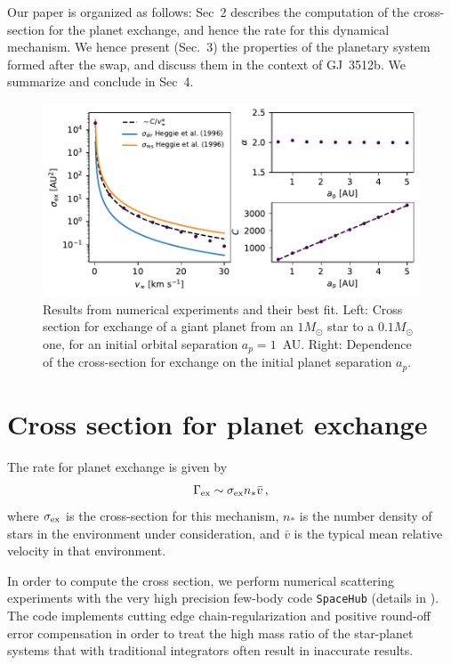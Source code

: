 \documentclass[twocolumn]{aastex62}
\begin{document}
Our paper is organized as follows: Sec~2 describes the computation of the cross-section for the planet exchange, 
and hence the rate for this dynamical mechanism. We hence present (Sec.~3) the 
properties of the planetary system formed after the swap, and discuss them in the context of GJ~3512b. We summarize and conclude in Sec~4.

\begin{figure}
 \includegraphics[width=1\columnwidth]{letter-fitting}
  \caption{Results from numerical experiments and their best fit. Left: Cross section for exchange of a giant planet from an $1M_\odot$ star to a $0.1M_\odot$ one, for an initial orbital separation $a_p=1$~AU.  Right: Dependence of the cross-section for exchange on the initial planet separation $a_p$. } 
 \label{fig:fitting}
\end{figure}

\section{Cross section for planet exchange}

The rate for planet exchange is given by
\begin{equation}
\Gamma_{\rm ex} \sim \sigma_{\rm ex} n_* \bar{v}\,,
\end{equation}
where $\sigma_{\rm ex}$ is the cross-section for this mechanism, $n_*$ is the number density of stars in the environment under consideration, and $\bar{v}$ is the typical mean relative velocity in that environment.

In order to compute the cross section, we perform 
numerical scattering experiments with the very high precision few-body code {\tt SpaceHub} (details in \citealt{Wang2018,Wang2019}). The code implements cutting edge chain-regularization \citep{Mikkola1993} and positive round-off error compensation in order to treat the high mass ratio of the star-planet systems that with traditional integrators often result in inaccurate results.
\end{document}
